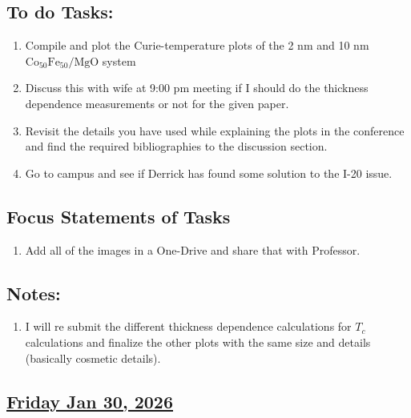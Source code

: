 \subsection*{To do Tasks:}
\begin{enumerate}
    \item Compile and plot the Curie-temperature plots of the 2 nm and 10 nm $\mathrm{Co_{50}Fe_{50}/MgO}$ system \cmark
    \item Discuss this with wife at 9:00 pm meeting if I should do the thickness dependence measurements or not for the given paper. 
    \item Revisit the details you have used while explaining the plots in the conference and find the required bibliographies to the discussion section.
    \item Go to campus and see if Derrick has found some solution to the I-20 issue. \cmark
\end{enumerate}
\subsection*{Focus Statements of Tasks}
\begin{enumerate}[\ding{52}]  %
     \item Add all of the images in a One-Drive and share that with Professor.  
\end{enumerate}
\subsection*{Notes:}
\begin{enumerate}
    \item I will re submit the different thickness dependence calculations for $T_c$ calculations and finalize the other plots with the same size and details (basically cosmetic details).
\end{enumerate}
\subsection*{\underline{Friday Jan 30, 2026}}
